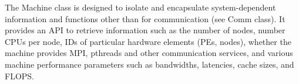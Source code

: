 
The Machine class is designed to isolate and encapsulate system-dependent
information and functions other than for communication (see Comm class).
It provides an API to retrieve information such as the number of nodes,
number CPUs per node, IDs of particular hardware elements (PEs, nodes),
whether the machine provides MPI, pthreads and other communication services,
and various machine performance parameters such as bandwidths, latencies,
cache sizes, and FLOPS.

